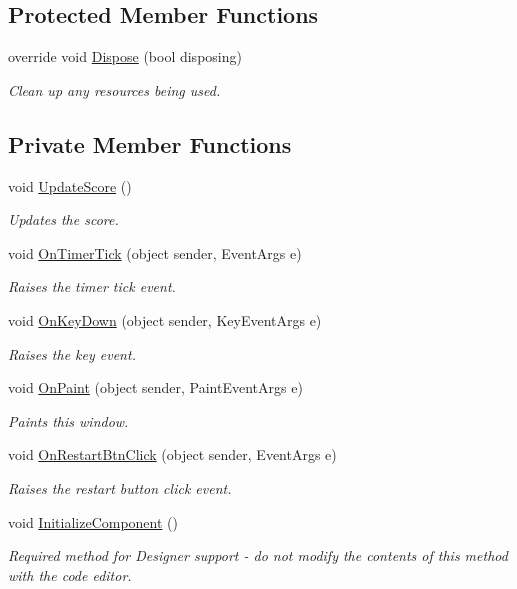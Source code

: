 \subsection*{Protected Member Functions}
\begin{DoxyCompactItemize}
\item 
override void \mbox{\hyperlink{class_snake_1_1_window_aeb80b0d2ae454bee60c5b587574884d6}{Dispose}} (bool disposing)
\begin{DoxyCompactList}\small\item\em Clean up any resources being used. \end{DoxyCompactList}\end{DoxyCompactItemize}
\subsection*{Private Member Functions}
\begin{DoxyCompactItemize}
\item 
void \mbox{\hyperlink{class_snake_1_1_window_ad7ff8d320d8b689f6c4df5170f922030}{Update\+Score}} ()
\begin{DoxyCompactList}\small\item\em Updates the score. \end{DoxyCompactList}\item 
void \mbox{\hyperlink{class_snake_1_1_window_aea9a1f8d7553baa30e67b58909210415}{On\+Timer\+Tick}} (object sender, Event\+Args e)
\begin{DoxyCompactList}\small\item\em Raises the timer tick event. \end{DoxyCompactList}\item 
void \mbox{\hyperlink{class_snake_1_1_window_af4974962d6658e8225bd9b840a3fca32}{On\+Key\+Down}} (object sender, Key\+Event\+Args e)
\begin{DoxyCompactList}\small\item\em Raises the key event. \end{DoxyCompactList}\item 
void \mbox{\hyperlink{class_snake_1_1_window_ae50a37d5b61d3704469c2902308d96e3}{On\+Paint}} (object sender, Paint\+Event\+Args e)
\begin{DoxyCompactList}\small\item\em Paints this window. \end{DoxyCompactList}\item 
void \mbox{\hyperlink{class_snake_1_1_window_af9391fc232a8726ba50d284bb23271bb}{On\+Restart\+Btn\+Click}} (object sender, Event\+Args e)
\begin{DoxyCompactList}\small\item\em Raises the restart button click event. \end{DoxyCompactList}\item 
void \mbox{\hyperlink{class_snake_1_1_window_a2291066b4718678884b7d69ae8360407}{Initialize\+Component}} ()
\begin{DoxyCompactList}\small\item\em Required method for Designer support -\/ do not modify the contents of this method with the code editor. \end{DoxyCompactList}\end{DoxyCompactItemize}

